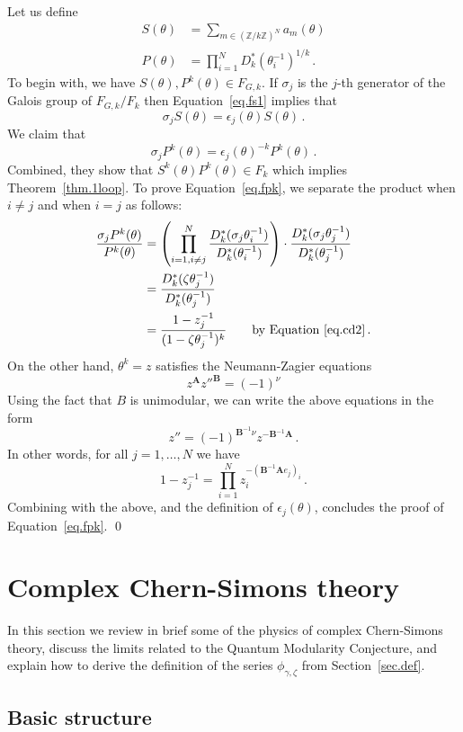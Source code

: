 \documentclass[12pt]{amsart}
\theoremstyle{definition}
\def\e{\epsilon}
\def\th{\theta}
\def\be{  \begin{equation} }
\def\ee{  \end{equation} }
\newcommand{\Z}{\mathbb{Z}}
\newcommand{\mb}{\mathbf}
\begin{document}
Let us define
\begin{align*}
S(\th) & =\sum_{m\in (\Z/k\Z)^N} a_m(\th) \\
P(\th) & = \prod_{i=1}^N D_k^*(\th_i^{-1})^{1/k} \,.
\end{align*}
To begin with, we have $S(\th), P^k(\th) \in F_{G,k}$.
If $\sigma_j$ is the $j$-th generator of the Galois group of $F_{G,k}/F_k$
then Equation~\eqref{eq.fs1} implies that 
$$
\sigma_j S(\th) = \e_j(\th) S(\th) \,.
$$
We claim that
\be
\label{eq.fpk}
\sigma_j P^k(\th) = \e_j(\th)^{-k} P^k(\th) \,.
\ee
Combined, they show that $S^k(\th) P^k(\th) \in F_k$ which implies 
Theorem~\ref{thm.1loop}. To prove Equation~\eqref{eq.fpk}, we 
separate the product when $i \neq j$ and when $i=j$ as follows:
\begin{align*}
\frac{\sigma_j P^k(\th)}{P^k(\th)} &=\left(\prod_{i=1,i\neq j}^N
\frac{D_k^*(\sigma_j \th_i^{-1})}{D_k^*(\th_i^{-1})} \right)\cdot
\frac{D_k^*(\sigma_j \th_j^{-1})}{D_k^*(\th_j^{-1})} \\ 
&= \frac{D_k^*(\zeta \th_j^{-1})}{D_k^*(\th_j^{-1})} \\
&= \frac{1-z^{-1}_j}{(1-\zeta \th_j^{-1})^k} \qquad 
\text{by Equation~\eqref{eq.cd2}} \,.
\end{align*}
On the other hand, $\th^k=z$ satisfies the Neumann-Zagier equations 
$$
z^{\mb A} z''^{\mb B} = (-1)^{\nu}
$$
Using the fact that $B$ is unimodular, we can write the above equations
in the form
$$
z''=(-1)^{\mb B^{-1} \nu} z^{-\mb B^{-1} \mb A} \,.
$$
In other words, for all $j=1,\dots,N$ we have
$$
1-z_j^{-1} = \prod_{i=1}^N z_i^{- (\mb B^{-1} \mb A e_j)_i} \,.
$$
Combining with the above, and the definition of $\epsilon_j(\th)$, 
concludes the proof of Equation~\eqref{eq.fpk}.
\qed


\section{Complex Chern-Simons theory}
\label{sec.CCS}

In this section we review in brief some of the physics of complex Chern-Simons 
theory, discuss the limits related to the Quantum Modularity Conjecture, and 
explain how to derive the definition of the series $\phi_{\gamma,\zeta}$ from 
Section~\ref{sec.def}.

\subsection{Basic structure}
\end{document}
